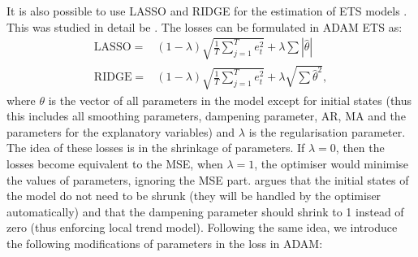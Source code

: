 \documentclass[]{book}
\theoremstyle{definition}
\theoremstyle{definition}
\theoremstyle{definition}
\theoremstyle{definition}
\theoremstyle{remark}
\begin{document}
It is also possible to use LASSO \citep{Tibshirani1996} and RIDGE for the estimation of ETS models \citep[ give a good overview of these losses with examples in R]{James2017}. This was studied in detail be \citet{Pritularga2022}. The losses can be formulated in ADAM ETS as:
\begin{equation}
  \begin{aligned}
    \mathrm{LASSO} = &(1-\lambda) \sqrt{\frac{1}{T} \sum_{j=1}^T e_t^2} + \lambda \sum |\hat{\theta}| \\
    \mathrm{RIDGE} = &(1-\lambda) \sqrt{\frac{1}{T} \sum_{j=1}^T e_t^2} + \lambda \sqrt{\sum \hat{\theta}^2},
  \end{aligned}
  \label{eq:Regularisation}
\end{equation}
where \(\theta\) is the vector of all parameters in the model except for initial states (thus this includes all smoothing parameters, dampening parameter, AR, MA and the parameters for the explanatory variables) and \(\lambda\) is the regularisation parameter. The idea of these losses is in the shrinkage of parameters. If \(\lambda=0\), then the losses become equivalent to the MSE, when \(\lambda=1\), the optimiser would minimise the values of parameters, ignoring the MSE part. \citet{Pritularga2022} argues that the initial states of the model do not need to be shrunk (they will be handled by the optimiser automatically) and that the dampening parameter should shrink to 1 instead of zero (thus enforcing local trend model). Following the same idea, we introduce the following modifications of parameters in the loss in ADAM:
\end{document}

